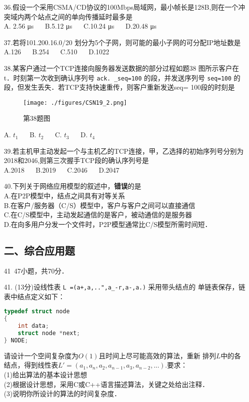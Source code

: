 36.假设一个采用CSMA/CD协议的100Mbps局域网，最小帧长是128B,则在一个冲突域内两个站点之间的单向传播延时最多是 \\
A. 2.56 μs $\quad$ B.5.12 μs $\quad$ C.10.24 μs
$\quad$ D.20.48 μs

37.若将101.200.16.0/20 划分为5个子网，则可能的最小子网的可分配IP地址数是 \\
A.126 $\quad$ B.254 $\quad$ C.510 $\quad$ D.1022

38.某客户通过一个TCP连接向服务器发送数据的部分过程如题38
图所示客户在t．时刻第一次收到确认序列号 \verb|ack. _seq=100| 的段，并发送序列号 \verb|seq=100| 的段，但发生丢失．若TCP支持快速重传，则客户重新发送seq= 100段的时刻是 \\
\begin{figure}[ht]
\centering
\texttt{[image: ./figures/CSN19\_2.png]}
\caption{第38题图} \label{CSN19_fig2}
\end{figure}
A. $t_1$ $\quad$ B. $t_2$ $\quad$ C. $t_3$ $\quad$ D. $t_4$

39.若主机甲主动发起一个与主机乙的TCP连接，甲，乙选择的初始序列号分别为2018和2046,则第三次握手TCP段的确认序列号是 \\
A.2018 $\quad$ B.2019 $\quad$ C.2046 $\quad$ D.2047

40.下列关于网络应用模型的叙述中，\textbf{错误}的是 \\
A.在P2P模型中，结点之间具有对等关系 \\
B.在客户/服务器（C/S）模型中，客户与客户之间可以直接通信 \\
C.在C/S模型中，主动发起通信的是客户，被动通信的是服务器 \\
D.在向多用户分发一个文件时，P2P模型通常比C/S模型所需时间短．

\subsection{二、综合应用题}
41~47小题，共70分．

41. (13分)设线性表 \verb|L =(a+,a,..",a_-r,a-,a.)| 采用带头结点的
单链表保存，链表中结点定义如下：
\begin{lstlisting}[language=cpp]
typedef struct node
{
    int data;
    struct node *next;
} NODE;
\end{lstlisting}
请设计一个空间复杂度为$O(1)$且时间上尽可能高效的算法，重新
排列$L$中的各结点，得到线性表$L'=(a_1,a_n,a_2,a_{n-1},a_3,a_{n-2},...)$.要求： \\
(1)给出算法的基本设计思想 \\
(2)根据设计思想，采用C或C++语言描述算法，关键之处给出注释． \\
(3)说明你所设计的算法的时间复杂度．

